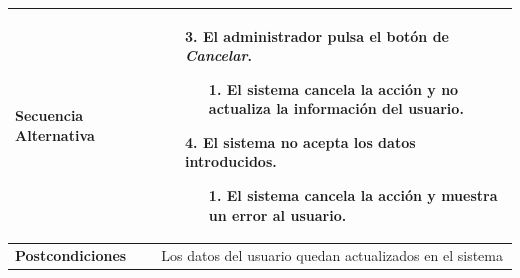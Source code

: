 \begin{longtable}{| p{4cm} | p{10cm} |}
\\
\hline
\textbf{Secuencia Alternativa} &\mbox{}\par\vspace{-\baselineskip}
\begin{enumerate}[leftmargin=0.9cm, topsep=0.1cm]
\item[3.] El administrador pulsa el botón de \textit{Cancelar}.
	\begin{itemize}
	\item[1.] El sistema cancela la acción y no actualiza la información del usuario.
	\end{itemize}
\item[4.] El sistema no acepta los datos introducidos.
	\begin{itemize}
	\item[1.] El sistema cancela la acción y muestra un error al usuario.
	\end{itemize}
\end{enumerate}
\\

\hline
\textbf{Postcondiciones} & 
Los datos del usuario quedan actualizados en el sistema\\
\hline
\end{longtable}



\newpage
